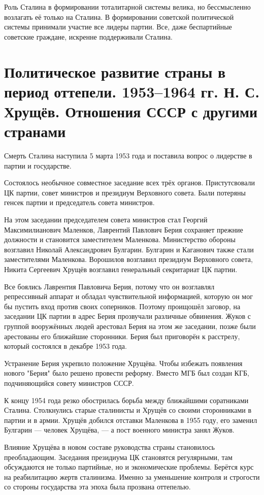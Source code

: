 \documentclass{article}
\begin{document}
Роль Сталина в формировании тоталитарной системы велика, но бессмысленно возлагать её только на Сталина. В формировании советской политической системы принимали участие все лидеры партии. Все, даже беспартийные советские граждане, искренне поддерживали Сталина. 

\section{Политическое развитие страны в период оттепели. 1953--1964 гг. Н. С. Хрущёв. Отношения СССР с другими странами}
Смерть Сталина наступила 5 марта 1953 года и поставила вопрос о лидерстве в партии и государстве.

Состоялось необычное совместное заседание всех трёх органов. Пристутсвовали ЦК партии, совет министров и президиум Верховного совета. Были потеряны генсек партии и председатель совета министров.

На этом заседании председателем совета министров стал Георгий Максимилианович Маленков, Лаврентий Павлович Берия сохраняет прежние должности и становится заместителем Маленкова. Министерство обороны возглавил Николай Александрович Булгарин. Булгарин и Каганович также стали заместителями Маленкова. Ворошилов возглавил президиум Верховного совета, Никита Сергеевич Хрущёв возглавил генеральный секритариат ЦК партии.

Все боялись Лаврентия Павловича Берия, потому что он возглавлял репрессивный аппарат и обладал чувствительной информацией, которую он мог бы пустить вход против своих соперников. Поэтому проищошёл заговор, на заседании ЦК партии в адрес Берия прозвучали различные обвинения. Жуков с группой вооружённых людей арестовал Берия на этом же заседании, позже были арестованы его ближайшие сторонники. Берия был приговорён к расстрелу, который состоялся в декабре 1953 года.

Устранение Берия укрепило положение Хрущёва. Чтобы избежать появления нового "Берия" было решено провести реформу. Вместо МГБ был создан КГБ, подчиняющийся совету министров СССР.

К концу 1954 года резко обострилась борьба между ближайшими соратниками Сталина. Столкнулись старые сталинисты и Хрущёв со своими сторонниками в партии и в армии. Хрущёв добился отставки Маленкова в 1955 году, его заменил Булгарин --- человек Хрущёва, --- а пост военного министра занял Жуков.

Влияние Хрущёва в новом составе руководства страны становилось преобладающим. Заседания президиума ЦК становятся регулярными, там обсуждаются не только партийные, но и экономические проблемы. Берётся курс на реабилитацию жертв сталинизма. Именно за уменьшение контроля и строгости со стороны государства эта эпоха была прозвана оттепелью.
\end{document}
